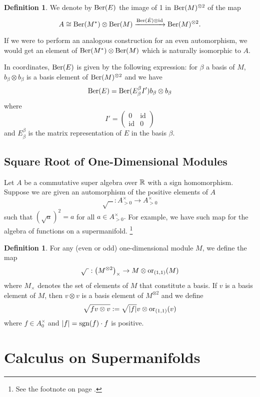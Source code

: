 \documentclass[11pt]{amsart}
\numberwithin{equation}{section}
\numberwithin{figure}{section}
\theoremstyle{plain}
\theoremstyle{definition}
\newtheorem{defn}[thm]{Definition}
\theoremstyle{remark}
\begin{document}
\begin{defn}
We denote by $\mathrm{Ber}(E)$ the image of 1 in $\mathrm{Ber}(M)^{\otimes2}$ of
the map 
\[
A\cong\mathrm{Ber}(M^{*})\otimes\mathrm{Ber}(M)\xrightarrow{\mathrm{Ber}(\hat{E})\otimes\mathrm{id}}\mathrm{Ber}(M)^{\otimes2}.
\]

\end{defn}
If we were to perform an analogous construction for an even automorphism,
we would get an element of $\mathrm{Ber}(M^{*})\otimes\mathrm{Ber}(M)$ which is naturally
isomorphic to $A$.

In coordinates, $\mathrm{Ber}(E)$ is given by the following expression: for
$\beta$ a basis of $M$, $b_{\mathcal{\beta}}\otimes b_{\mathcal{\beta}}$
is a basis element of $\mathrm{Ber}(M)^{\otimes2}$ and we have 
\[
\mathrm{Ber}(E)=\mathrm{Ber}(E_{\beta}^{\beta}I')b_{\beta}\otimes b_{\beta}
\]
where 
\[
I'=\left(\begin{matrix}0 & \mbox{id}\\
\mbox{id} & 0
\end{matrix}\right)
\]
and $E_{\beta}^{\beta}$ is the matrix representation of $E$ in the
basis $\beta$.


\subsection{Square Root of One-Dimensional Modules\label{sub:Square-Root-of-1-d-modules}}

Let $A$ be a commutative super algebra over $\mathbb{R}$ with a sign homomorphism.
Suppose we are given an automorphism of the positive elements of $A$
\[
\sqrt{\mbox{ }}:A_{>0}^{\times}\rightarrow A_{>0}^{\times}
\]
such that $\left(\sqrt{a}\right)^{2}=a$ for all $a\in A_{>0}^{\times}.$
For example, we have such map for the algebra of functions on a supermanifold.%
\footnote{See the footnote on page \pageref{fn:Square_Root_on_Supermanifolds}.%
}
\begin{defn}
For any (even or odd) one-dimensional module $M$, we define the map
\[
\sqrt{\mbox{ }}:\left(M^{\otimes2}\right)_{\times}\rightarrow M\otimes\mathrm{or}_{(1,1)}(M)
\]
where $M_{\times}$ denotes the set of elements of $M$ that constitute
a basis. If $v$ is a basis element of $M$, then $v\otimes v$ is
a basis element of $M^{\otimes2}$ and we define 
\[
\sqrt{fv\otimes v}:=\sqrt{\lvert f\rvert}v\otimes\mathrm{or}_{(1,1)}(v)
\]
where $f\in A_{0}^{\times}$ and $|f|=\mathrm{sgn}(f)\cdot f$ is positive.
\end{defn}

\section{Calculus on Supermanifolds\label{sec:Calculus-on-Supermanifolds}}
\end{document}
